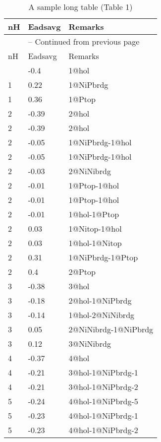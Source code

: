 
\clearpage
\begin{center}
\centering
\begin{longtable}{|l|l|l|}
\caption{A sample long table (Table 1)}
\label{tab:long1} \\
\hline
nH & Eadsavg & Remarks \\ \hline
\endfirsthead

\multicolumn{3}{c}{\tablename\ \thetable{} -- Continued from previous page} \\ \hline
nH & Eadsavg & Remarks \\ \hline
\endhead

\hline
\endfoot

\hline
\endlastfoot
1 & -0.4 & 1@hol \\ \hline
1 & 0.22 & 1@NiPbrdg \\ \hline
1 & 0.36 & 1@Ptop \\ \hline
2 & -0.39 & 2@hol \\ \hline
2 & -0.39 & 2@hol \\ \hline
2 & -0.05 & 1@NiPbrdg-1@hol \\ \hline
2 & -0.05 & 1@NiPbrdg-1@hol \\ \hline
2 & -0.03 & 2@NiNibrdg \\ \hline
2 & -0.01 & 1@Ptop-1@hol \\ \hline
2 & -0.01 & 1@Ptop-1@hol \\ \hline
2 & -0.01 & 1@hol-1@Ptop \\ \hline
2 & 0.03 & 1@Nitop-1@hol \\ \hline
2 & 0.03 & 1@hol-1@Nitop \\ \hline
2 & 0.31 & 1@NiPbrdg-1@Ptop \\ \hline
2 & 0.4 & 2@Ptop \\ \hline
3 & -0.38 & 3@hol \\ \hline
3 & -0.18 & 2@hol-1@NiPbrdg \\ \hline
3 & -0.14 & 1@hol-2@NiNibrdg \\ \hline
3 & 0.05 & 2@NiNibrdg-1@NiPbrdg \\ \hline
3 & 0.12 & 3@NiNibrdg \\ \hline
4 & -0.37 & 4@hol \\ \hline
4 & -0.21 & 3@hol-1@NiPbrdg-1 \\ \hline
4 & -0.21 & 3@hol-1@NiPbrdg-2 \\ \hline
5 & -0.24 & 4@hol-1@NiPbrdg-5 \\ \hline
5 & -0.23 & 4@hol-1@NiPbrdg-1 \\ \hline
5 & -0.23 & 4@hol-1@NiPbrdg-2 \\ \hline

\end{longtable}
\end{center}
